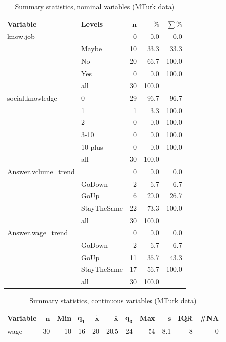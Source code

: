 \documentclass[a4paper,10pt]{article}\usepackage[]{graphicx}\usepackage[]{color}
\begin{document}
\begin{table}[ht]
\centering
{\footnotesize
\begin{tabular}{ll|rrr}
 \textbf{Variable} & \textbf{Levels} & $\mathbf{n}$ & $\mathbf{\%}$ & $\mathbf{\sum \%}$ \\ 
  \hline
know.job &  & 0 & 0.0 & 0.0 \\ 
   & Maybe & 10 & 33.3 & 33.3 \\ 
   & No & 20 & 66.7 & 100.0 \\ 
   & Yes & 0 & 0.0 & 100.0 \\ 
   \hline
 & all & 30 & 100.0 &  \\ 
   \hline
\hline
social.knowledge & 0 & 29 & 96.7 & 96.7 \\ 
   & 1 & 1 & 3.3 & 100.0 \\ 
   & 2 & 0 & 0.0 & 100.0 \\ 
   & 3-10 & 0 & 0.0 & 100.0 \\ 
   & 10-plus & 0 & 0.0 & 100.0 \\ 
   \hline
 & all & 30 & 100.0 &  \\ 
   \hline
\hline
Answer.volume\_trend &  & 0 & 0.0 & 0.0 \\ 
   & GoDown & 2 & 6.7 & 6.7 \\ 
   & GoUp & 6 & 20.0 & 26.7 \\ 
   & StayTheSame & 22 & 73.3 & 100.0 \\ 
   \hline
 & all & 30 & 100.0 &  \\ 
   \hline
\hline
Answer.wage\_trend &  & 0 & 0.0 & 0.0 \\ 
   & GoDown & 2 & 6.7 & 6.7 \\ 
   & GoUp & 11 & 36.7 & 43.3 \\ 
   & StayTheSame & 17 & 56.7 & 100.0 \\ 
   \hline
 & all & 30 & 100.0 &  \\ 
   \hline
\hline
\end{tabular}
}
\caption{Summary statistics, nominal variables (MTurk data)} 
\label{tab1:13-1190}
\end{table}
\begin{table}[ht]
\centering
{\footnotesize
\begin{tabular}{lrrrrrrrrrr}
 \textbf{Variable} & $\mathbf{n}$ & \textbf{Min} & $\mathbf{q_1}$ & $\mathbf{\widetilde{x}}$ & $\mathbf{\bar{x}}$ & $\mathbf{q_3}$ & \textbf{Max} & $\mathbf{s}$ & \textbf{IQR} & \textbf{\#NA} \\ 
  \hline
wage & 30 & 10 & 16 & 20 & 20.5 & 24 & 54 & 8.1 & 8 & 0 \\ 
  \end{tabular}
}
\caption{Summary statistics, continuous variables (MTurk data)} 
\label{tab2:13-1190}
\end{table}
\end{document}
